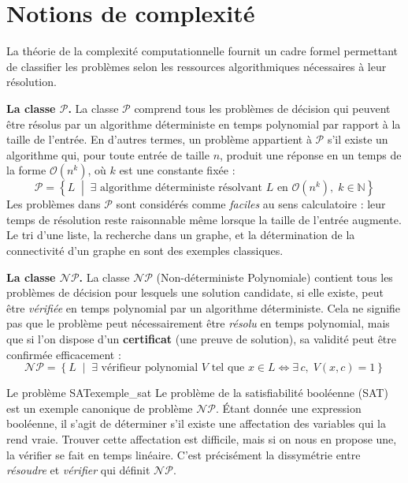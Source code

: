 \documentclass[12pt, a4paper, twoside, openright]{book}
\newcommand{\N}{\mathbb{N}}
\begin{document}
	
	\section{Notions de complexité}
	\label{sec:notions_complexite}
	
	La théorie de la complexité computationnelle fournit un cadre formel
	permettant de classifier les problèmes selon les ressources algorithmiques
	nécessaires à leur résolution.
	
	\textbf{La classe $\mathcal{P}$.}
	La classe $\mathcal{P}$ comprend tous les problèmes de décision qui peuvent
	être résolus par un algorithme déterministe en temps polynomial par rapport
	à la taille de l'entrée. En d'autres termes, un problème appartient à
	$\mathcal{P}$ s'il existe un algorithme qui, pour toute entrée de taille
	$n$, produit une réponse en un temps de la forme $\mathcal{O}(n^k)$, où
	$k$ est une constante fixée :
	$$
	\mathcal{P} = \left\{ L \;\middle|\; \exists \text{ algorithme
		déterministe résolvant } L \text{ en }
	\mathcal{O}(n^k), \; k \in \N \right\}
	$$
	Les problèmes dans $\mathcal{P}$ sont considérés comme \textit{faciles}
	au sens calculatoire : leur temps de résolution reste raisonnable même
	lorsque la taille de l'entrée augmente. Le tri d'une liste, la recherche
	dans un graphe, et la détermination de la connectivité d'un graphe en
	sont des exemples classiques.
	
	\textbf{La classe $\mathcal{NP}$.}
	La classe $\mathcal{NP}$ (Non-déterministe Polynomiale) contient tous les
	problèmes de décision pour lesquels une solution candidate, si elle existe,
	peut être \textit{vérifiée} en temps polynomial par un algorithme
	déterministe. Cela ne signifie pas que le problème peut nécessairement
	être \textit{résolu} en temps polynomial, mais que si l'on dispose d'un
	\textbf{certificat} (une preuve de solution), sa validité peut être
	confirmée efficacement :
	$$
	\mathcal{NP} = \left\{ L \;\middle|\; \exists \text{ vérifieur
		polynomial } V \text{ tel que }
	x \in L \Leftrightarrow \exists\, c,\; V(x, c) = 1 \right\}
	$$
	
	\begin{example}{Le problème SAT}{exemple_sat}
		Le problème de la satisfiabilité booléenne (SAT) est un exemple
		canonique de problème $\mathcal{NP}$. Étant donnée une expression
		booléenne, il s'agit de déterminer s'il existe une affectation des
		variables qui la rend vraie. Trouver cette affectation est difficile,
		mais si on nous en propose une, la vérifier se fait en temps linéaire.
		C'est précisément la dissymétrie entre \textit{résoudre} et
		\textit{vérifier} qui définit $\mathcal{NP}$.
	\end{example}
	
\end{document}
